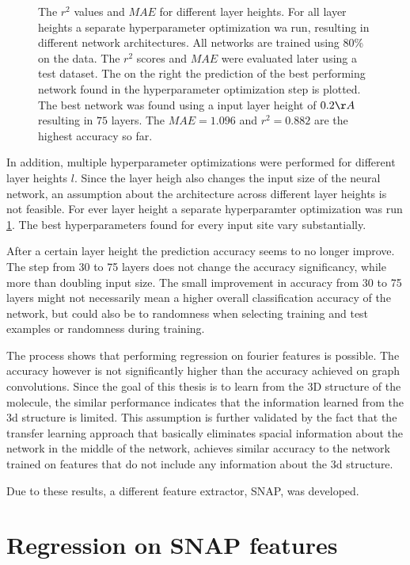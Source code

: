 \begin{figure}[!htb]
    \endminipage
    \caption{
    The $r^2$ values and $MAE$ for different layer heights.
    For all layer heights a separate hyperparameter optimization wa run, resulting in different network architectures.
    All networks are trained using 80\% on the data. The $r^2$ scores and $MAE$ were evaluated later using a test dataset.
    The on the right the prediction of the best performing network found in the hyperparameter optimization step is plotted.
    The best network was found using a input layer height of $0.2 \AA$ resulting in $75$ layers. 
    The $MAE=1.096$ and $r^2=0.882$ are the highest accuracy so far.
    }
    \label{fig:fourier_final}
\end{figure}


In addition, multiple hyperparameter optimizations were performed for different layer heights $l$.
Since the layer heigh also changes the input size of the neural network, an assumption about the 
architecture across different layer heights is not feasible.
For ever layer height a separate hyperparamter optimization was run \ref{fig:fourier_final}.
The best hyperparameters found for every input site vary substantially.

After a certain layer height the prediction accuracy seems to no longer improve.
The step from 30 to 75 layers does not change the accuracy significancy, while more than doubling input size.
The small improvement in accuracy from 30 to 75 layers might not necessarily mean a higher overall classification accuracy of the network,
but could also be to randomness when selecting training and test examples or randomness during training.

The process shows that performing regression on fourier features is possible.
The accuracy however is not significantly higher than the accuracy achieved on graph convolutions.
Since the goal of this thesis is to learn from the 3D structure of the molecule, the similar performance 
indicates that the information learned from the 3d structure is limited.
This assumption is further validated by the fact that the transfer learning approach that 
basically eliminates spacial information about the network in the middle of the network, achieves similar accuracy to the 
network trained on features that do not include any information about the 3d structure.

Due to these results, a different feature extractor, SNAP, was developed.

\section{Regression on SNAP features}
\label{sec:Evaluation:snap}

